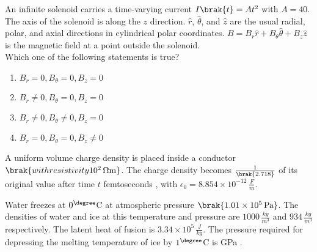 \iffalse
                       
                        
                        
                        
                    
                        \author{AI24BTECH11006 - Bugada Roopansha}
                        \section{PH}
                        \chapter{2017}
                        \fi
 
    \item 
    An infinite solenoid carries a time-varying current $I\brak{t} = At^2$ with $A = 40$. The axis of the solenoid is along the $z$ direction. $\hat{r}$, $\hat{\theta}$, and $\hat{z}$ are the usual radial, polar, and axial directions in cylindrical polar coordinates. $B = B_r \hat{r} + B_\theta \hat{\theta} + B_z \hat{z}$ is the magnetic field at a point outside the solenoid. \\
    Which one of the following statements is true?
    \begin{enumerate}
        \item $B_r = 0, B_\theta = 0, B_z = 0$
        \item $B_r \neq 0, B_\theta = 0, B_z = 0$
        \item $B_r \neq 0, B_\theta \neq 0, B_z = 0$
        \item $B_r = 0, B_\theta = 0, B_z \neq 0$
    \end{enumerate}
    
    \item 

    A uniform volume charge density is placed inside a conductor $\brak{with resistivity 10^2 \, \Omega \text{m}}$. The charge density becomes $\frac{1}{\brak{2.718}}$ of its original value after time $t$ femtoseconds , with $\epsilon_0 = 8.854 \times 10^{-12} \, \frac{F}{m}$.
    
    \item 
    Water freezes at $0^\degree$C at atmospheric pressure $\brak{1.01 \times 10^5 \, \text{Pa}}$. The densities of water and ice at this temperature and pressure are $1000 \, \frac {kg}{m^3}$ and $934 \, \frac{kg}{m^3}$ respectively. The latent heat of fusion is $3.34 \times 10^5 \, \frac{J}{kg}$. The pressure required for depressing the melting temperature of ice by $1^\degree$C is  GPa .
    
